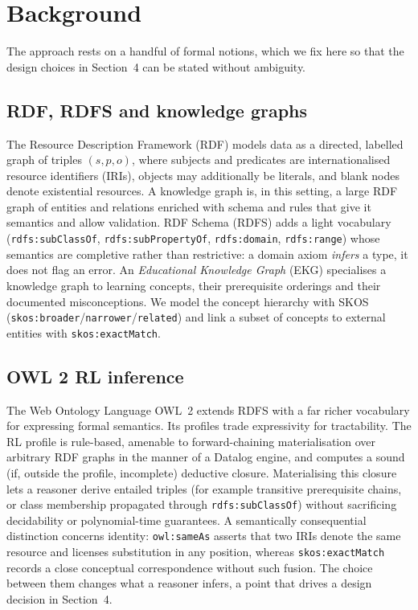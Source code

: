 \documentclass[sageh]{sagej}
\begin{document}
\section{Background}
The approach rests on a handful of formal notions, which we fix here so that the design choices in Section~4 can be stated without ambiguity.

\subsection{RDF, RDFS and knowledge graphs}
The Resource Description Framework (RDF) models data as a directed, labelled graph of triples $(s,p,o)$, where subjects and predicates are internationalised resource identifiers (IRIs), objects may additionally be literals, and blank nodes denote existential resources.\cite{w3c-rdf11,hogan2021kgsurvey} A knowledge graph is, in this setting, a large RDF graph of entities and relations enriched with schema and rules that give it semantics and allow validation.\cite{hogan2021kgsurvey} RDF Schema (RDFS) adds a light vocabulary (\texttt{rdfs:subClassOf}, \texttt{rdfs:sub\-PropertyOf}, \texttt{rdfs:domain}, \texttt{rdfs:range}) whose semantics are completive rather than restrictive: a domain axiom \emph{infers} a type, it does not flag an error. An \emph{Educational Knowledge Graph} (EKG) specialises a knowledge graph to learning concepts, their prerequisite orderings and their documented misconceptions. We model the concept hierarchy with SKOS (\texttt{skos:broader}/\texttt{narrower}/\texttt{related}) and link a subset of concepts to external entities with \texttt{skos:exactMatch}.\cite{w3c-skos}

\subsection{OWL 2 RL inference}
The Web Ontology Language OWL~2 extends RDFS with a far richer vocabulary for expressing formal semantics. Its profiles trade expressivity for tractability. The RL profile is rule-based, amenable to forward-chaining materialisation over arbitrary RDF graphs in the manner of a Datalog engine, and computes a sound (if, outside the profile, incomplete) deductive closure.\cite{w3c-owl2-profiles} Materialising this closure lets a reasoner derive entailed triples (for example transitive prerequisite chains, or class membership propagated through \texttt{rdfs:subClassOf}) without sacrificing decidability or polynomial-time guarantees. A semantically consequential distinction concerns identity: \texttt{owl:sameAs} asserts that two IRIs denote the same resource and licenses substitution in any position, whereas \texttt{skos:exactMatch} records a close conceptual correspondence without such fusion. The choice between them changes what a reasoner infers, a point that drives a design decision in Section~4.
\end{document}

